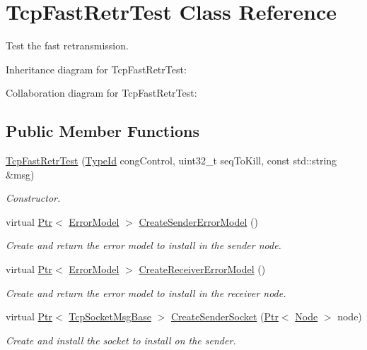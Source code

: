 \hypertarget{classTcpFastRetrTest}{}\section{Tcp\+Fast\+Retr\+Test Class Reference}
\label{classTcpFastRetrTest}


Test the fast retransmission.  




Inheritance diagram for Tcp\+Fast\+Retr\+Test\+:


Collaboration diagram for Tcp\+Fast\+Retr\+Test\+:
\subsection*{Public Member Functions}
\begin{DoxyCompactItemize}
\item 
\hyperlink{classTcpFastRetrTest_a9d4cd22da55cf3761d0057435c2b5f9e}{Tcp\+Fast\+Retr\+Test} (\hyperlink{classns3_1_1TypeId}{Type\+Id} cong\+Control, uint32\+\_\+t seq\+To\+Kill, const std\+::string \&msg)
\begin{DoxyCompactList}\small\item\em Constructor. \end{DoxyCompactList}\item 
virtual \hyperlink{classns3_1_1Ptr}{Ptr}$<$ \hyperlink{classns3_1_1ErrorModel}{Error\+Model} $>$ \hyperlink{classTcpFastRetrTest_abd75328aa62efac7a1e711512eeca155}{Create\+Sender\+Error\+Model} ()
\begin{DoxyCompactList}\small\item\em Create and return the error model to install in the sender node. \end{DoxyCompactList}\item 
virtual \hyperlink{classns3_1_1Ptr}{Ptr}$<$ \hyperlink{classns3_1_1ErrorModel}{Error\+Model} $>$ \hyperlink{classTcpFastRetrTest_a42205ea481c029c1f7202d0eba41e098}{Create\+Receiver\+Error\+Model} ()
\begin{DoxyCompactList}\small\item\em Create and return the error model to install in the receiver node. \end{DoxyCompactList}\item 
virtual \hyperlink{classns3_1_1Ptr}{Ptr}$<$ \hyperlink{classns3_1_1TcpSocketMsgBase}{Tcp\+Socket\+Msg\+Base} $>$ \hyperlink{classTcpFastRetrTest_a2c9d7bede67aca9e0c96f2dc0e6ff9c1}{Create\+Sender\+Socket} (\hyperlink{classns3_1_1Ptr}{Ptr}$<$ \hyperlink{classns3_1_1Node}{Node} $>$ node)
\begin{DoxyCompactList}\small\item\em Create and install the socket to install on the sender. \end{DoxyCompactList}\end{DoxyCompactItemize}
